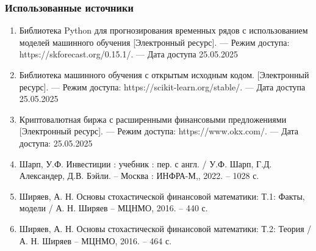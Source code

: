 \documentclass{beamer}
\begin{document}
\begin{frame}
    \frametitle{Использованные источники}
    \begin{enumerate}
        \item 
        Библиотека Python для прогнозирования временных рядов с использованием моделей машинного обучения
        [Электронный ресурс]. --- Режим доступа: https://skforecast.org/0.15.1/. --- Дата доступа 25.05.2025

        \item 
        Библиотека машинного обучения с открытым исходным кодом.
        [Электронный ресурс]. --- Режим доступа: https://scikit-learn.org/stable/. --- Дата доступа 25.05.2025
        
        \item 
        Криптовалютная биржа с расширенными финансовыми предложениями
        [Электронный ресурс]. --- 
        Режим доступа: https://www.okx.com/. --- Дата доступа: 25.05.2025

        \item 
        Шарп, У.Ф. Инвестиции : учебник : пер. с англ. / У.Ф. Шарп, Г.Д. Александер, Д.В. Бэйли. -- Москва : ИНФРА-М,, 2022. -- 1028 с.

        \item 
        Ширяев, А. Н. Основы стохастической финансовой математики: Т.1: Факты, модели / А. Н. Ширяев -- МЦНМО, 2016. -- 440 с.

        \item 
        Ширяев, А. Н. Основы стохастической финансовой математики: Т.2: Теория / А. Н. Ширяев -- МЦНМО, 2016. -- 464 с.
    \end{enumerate}
\end{frame}
\end{document}
